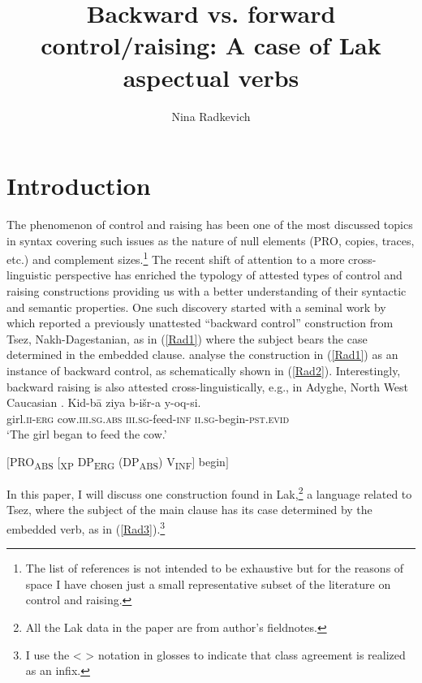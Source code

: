 \documentclass[output=paper]{langscibook}
\author{Nina Radkevich\affiliation{University of York}}
\title{Backward vs. forward control/raising: A case of Lak aspectual verbs}
\begin{document}
\maketitle

\section{Introduction}
The phenomenon of control and raising has been one of the most discussed topics in syntax \citep{hornstein1999,Landau2001,Landau2003,Landau2004,martin2001,BoeckxHornstein2003,BoeckxHornstein2004,DaviesDubinsky2004,Wurmbrand1999,wurmbrand2001,Wurmbrand2007} covering such issues as the nature of null elements (PRO, copies, traces, etc.) and complement sizes.\footnote{The list of references is not intended to be exhaustive but for the reasons of space I have chosen just a small representative subset of the literature on control and raising.} The recent shift of attention to a more cross-linguistic perspective  has enriched the typology of attested types of control and raising constructions providing us with a better understanding of their syntactic and semantic properties. One such discovery started with a seminal work by \citet{PolinskyPotsdam2002} which reported a previously unattested “backward control” construction from Tsez, Nakh-Dagestanian, as in (\ref{Rad1}) where the subject bears the case determined in the embedded clause. \citet{PolinskyPotsdam2002} analyse the construction in (\ref{Rad1}) as an instance of backward control, as schematically shown in (\ref{Rad2}). Interestingly, backward raising is also attested cross-linguistically, e.g., in Adyghe, North West Caucasian \citep{PotsdamPolinsky2012}.  
\ea\label{Rad1}
\gll Kid-bā ziya b-išr-a y-oq-si. \\
girl.\textsc{ii-erg} 		cow\textsc{.iii.sg.abs} 	\textsc{iii.sg}-feed-\textsc{inf} \textsc{ii.sg}-begin-\textsc{pst.evid}\\
\glt ‘The girl began to feed the cow.’    \citep[248]{PolinskyPotsdam2002}
\z 

\ea\label{Rad2}
$[$PRO\textsubscript{ABS}  $[$\textsubscript{XP} DP\textsubscript{ERG}  (DP\textsubscript{ABS})  V\textsubscript{INF}$]$  begin$]$\\
\z


In this paper, I will discuss one construction found in Lak,\footnote{All the Lak data in the paper are from author's fieldnotes.} a language related to Tsez, where the subject of the main clause has its case determined by the embedded verb, as in (\ref{Rad3}).\footnote{I use the < > notation in glosses to indicate that class agreement is realized as an infix.} 
\end{document}
